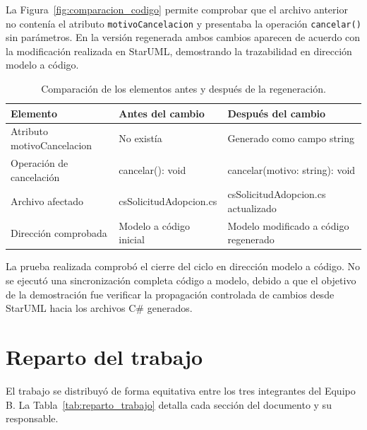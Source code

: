 \documentclass[journal,onecolumn]{IEEEtran}
\begin{document}
La Figura~\ref{fig:comparacion_codigo} permite comprobar que el archivo anterior no contenía el atributo \texttt{motivoCancelacion} y presentaba la operación \texttt{cancelar()} sin parámetros. En la versión regenerada ambos cambios aparecen de acuerdo con la modificación realizada en StarUML, demostrando la trazabilidad en dirección modelo a código.

\begin{table}[H]
	\centering
	\caption{Comparación de los elementos antes y después de la regeneración.}
	\label{tab:comparacion_elementos}
	\begin{tabular}{|l|l|l|}
		\hline
		\textbf{Elemento} & \textbf{Antes del cambio} & \textbf{Después del cambio} \\
		\hline
		Atributo motivoCancelacion & No existía & Generado como campo string \\
		\hline
		Operación de cancelación & cancelar(): void & cancelar(motivo: string): void \\
		\hline
		Archivo afectado & csSolicitudAdopcion.cs & csSolicitudAdopcion.cs actualizado \\
		\hline
		Dirección comprobada & Modelo a código inicial & Modelo modificado a código regenerado \\
		\hline
	\end{tabular}
\end{table}

La prueba realizada comprobó el cierre del ciclo en dirección modelo a código. No se ejecutó una sincronización completa código a modelo, debido a que el objetivo de la demostración fue verificar la propagación controlada de cambios desde StarUML hacia los archivos C\# generados.

\section{Reparto del trabajo}

El trabajo se distribuyó de forma equitativa entre los tres integrantes del Equipo B. La Tabla~\ref{tab:reparto_trabajo} detalla cada sección del documento y su responsable.
\end{document}
